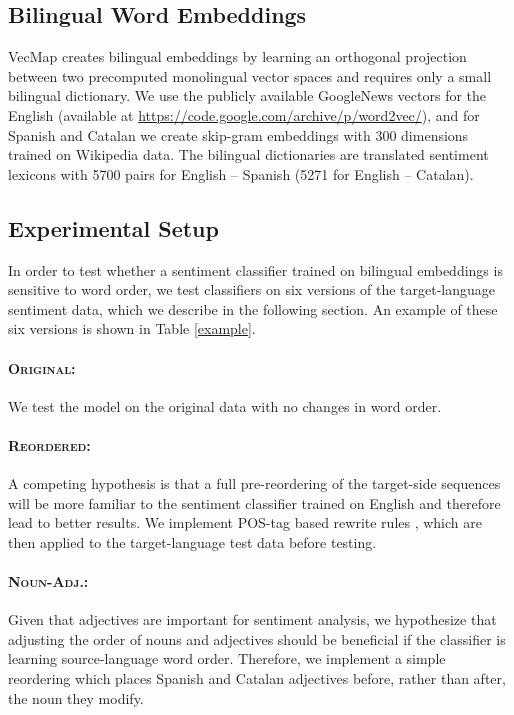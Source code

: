 \documentclass[a4paper,11pt,twocolumn,twoside]{article}
\newcommand{\original}{\textsc{Original}\xspace}
\newcommand{\mtreordered}{\textsc{Reordered}\xspace}
\newcommand{\nadj}{\textsc{Noun-Adj.}\xspace}
\begin{document}
\subsection{Bilingual Word Embeddings}

VecMap \cite{Artetxe2016,Artetxe2017} creates bilingual embeddings by learning an orthogonal projection between two precomputed monolingual vector spaces and requires only a small bilingual dictionary. We use the publicly available GoogleNews vectors for the English (available at \url{https://code.google.com/archive/p/word2vec/}), and for Spanish and Catalan we create skip-gram embeddings with 300 dimensions trained on Wikipedia data. The bilingual dictionaries are translated sentiment lexicons with 5700 pairs for English -- Spanish (5271 for English -- Catalan).


\subsection{Experimental Setup}


In order to test whether a sentiment classifier trained on bilingual embeddings is sensitive to word order, we test classifiers on six versions of the target-language sentiment data, which we describe in the following section. An example of these six versions is shown in Table \ref{example}.

\paragraph{\original: } We test the model on the original data with no changes in word order.

\paragraph{\mtreordered: }A competing hypothesis is that a full pre-reordering of the target-side sequences will be more familiar to the sentiment classifier trained on English and therefore lead to better results. We implement POS-tag based rewrite rules \cite{Crego2006,Crego2006b}, which are then applied to the target-language test data before testing.

\paragraph{\nadj: }Given that adjectives are important for sentiment analysis, we hypothesize that adjusting the order of nouns and adjectives should be beneficial if the classifier is learning source-language word order. Therefore, we implement a simple reordering which places Spanish and Catalan adjectives before, rather than after, the noun they modify.
\end{document}
